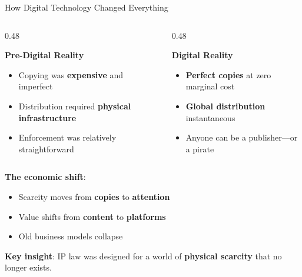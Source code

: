 \documentclass[aspectratio=169]{beamer}
\begin{document}
\begin{frame}{How Digital Technology Changed Everything}
\begin{columns}[T]
\begin{column}{0.48\textwidth}
\begin{block}{\textbf{Pre-Digital Reality}}
\begin{itemize}
    \item Copying was \textbf{expensive} and imperfect
    \item Distribution required \textbf{physical infrastructure}
    \item Enforcement was relatively straightforward
\end{itemize}
\end{block}
\end{column}

\begin{column}{0.48\textwidth}
\begin{block}{\textbf{Digital Reality}}
\begin{itemize}
    \item \textbf{Perfect copies} at zero marginal cost
    \item \textbf{Global distribution} instantaneous
    \item Anyone can be a publisher---or a pirate
\end{itemize}
\end{block}
\end{column}
\end{columns}

\vspace{0.4cm}
\textbf{The economic shift}:
\begin{itemize}
    \item Scarcity moves from \textbf{copies} to \textbf{attention}
    \item Value shifts from \textbf{content} to \textbf{platforms}
    \item Old business models collapse
\end{itemize}

\vspace{0.2cm}
\textbf{Key insight}: IP law was designed for a world of \textbf{physical scarcity} that no longer exists.
\end{frame}
\end{document}
